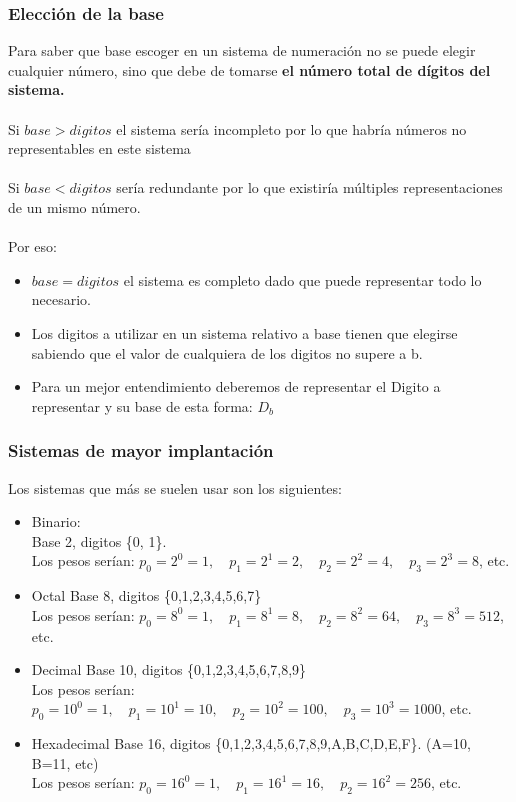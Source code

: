 \documentclass{article}
\begin{document}
\subsubsection{Elección de la base}
Para saber que base escoger en un sistema de numeración no se puede elegir cualquier número, sino que debe
de tomarse \textbf{el número total de dígitos del sistema.}\\\\
Si $base > digitos$ el sistema sería incompleto por lo que habría números no representables en este sistema\\\\
Si $base < digitos$ sería redundante por lo que existiría múltiples representaciones de un mismo número.\\\\
Por eso:
\begin{itemize}
    \item $base = digitos$  el sistema es completo dado que puede representar todo lo necesario.
    \item Los digitos a utilizar en un sistema relativo a base tienen que elegirse sabiendo que el valor
    de  cualquiera de los digitos no supere a b.
    \item Para un mejor entendimiento deberemos de representar el Digito a representar y su base de esta forma:
    $D_b$
\end{itemize}
\newpage
\subsubsection{Sistemas de mayor implantación}
Los sistemas que más se suelen usar son los siguientes:
\begin{itemize}
    \item Binario: \\
    Base 2, digitos \{0, 1\}.\\
    Los pesos serían: $p_0 = 2^0 =1 ,\quad p_1 = 2^1 =2 ,\quad p_2 = 2^2 =4,
    \quad p_3 = 2^3 =8$, etc.
    \item Octal
    Base 8, digitos \{0,1,2,3,4,5,6,7\}\\
    Los pesos serían: $p_0 = 8^0 =1, \quad p_1 = 8^1 =8, \quad p_2 = 8^2 =64
   , \quad p_3 = 8^3 =512$, etc.
    \item Decimal
    Base 10, digitos \{0,1,2,3,4,5,6,7,8,9\}\\
    Los pesos serían: $p_0 = 10^0 =1, \quad p_1 = 10^1 =10, \quad p_2 = 10^2 =100
   , \quad p_3 = 10^3 =1000$, etc.
    \item Hexadecimal
    Base 16, digitos \{0,1,2,3,4,5,6,7,8,9,A,B,C,D,E,F\}. (A=10, B=11, etc)\\
    Los pesos serían: $p_0 = 16^0 =1, \quad p_1 = 16^1 =16, \quad p_2 = 16^2 =256$,
    etc.
\end{itemize}
\end{document}
